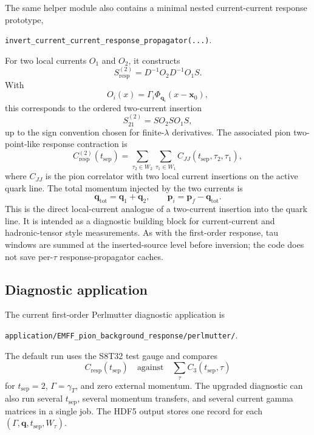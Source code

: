 \documentclass[11pt,a4paper]{article}
\newcommand{\Dslash}{D}
\newcommand{\Sresp}{S_{\mathrm{resp}}}
\newcommand{\Cthree}{C_3}
\newcommand{\Cresp}{C_{\mathrm{resp}}}
\newcommand{\Cresptwo}{C_{\mathrm{resp}}^{(2)}}
\begin{document}
The same helper module also contains a minimal nested current-current response
prototype,
\begin{center}
\texttt{invert\_current\_current\_response\_propagator(...)}.
\end{center}
For two local currents \(O_1\) and \(O_2\), it constructs
\begin{equation}
  \Sresp^{(2)}
  =
  \Dslash^{-1} O_2 \Dslash^{-1} O_1 S.
\end{equation}
With
\begin{equation}
  O_i(x)
  =
  \Gamma_i \Phi_{\mathbf q_i}(x-\mathbf x_0),
\end{equation}
this corresponds to the ordered two-current insertion
\begin{equation}
  S^{(2)}_{21}
  =
  S O_2 S O_1 S,
\end{equation}
up to the sign convention chosen for finite-\(\lambda\) derivatives.  The
associated pion two-point-like response contraction is
\begin{equation}
  \Cresptwo(t_{\mathrm{sep}})
  =
  \sum_{\tau_2\in W_2}
  \sum_{\tau_1\in W_1}
  C_{JJ}(t_{\mathrm{sep}},\tau_2,\tau_1),
\end{equation}
where \(C_{JJ}\) is the pion correlator with two local current insertions on
the active quark line.  The total momentum injected by the two currents is
\begin{equation}
  \mathbf q_{\mathrm{tot}} = \mathbf q_1 + \mathbf q_2,
  \qquad
  \mathbf p_i = \mathbf p_f - \mathbf q_{\mathrm{tot}}.
\end{equation}
This is the direct local-current analogue of a two-current insertion into the
quark line.  It is intended as a diagnostic building block for current-current
and hadronic-tensor style measurements.  As with the first-order response, tau
windows are summed at the inserted-source level before inversion; the code does
not save per-\(\tau\) response-propagator caches.

\subsection{Diagnostic application}

The current first-order Perlmutter diagnostic application is
\begin{center}
\texttt{application/EMFF\_pion\_background\_response/perlmutter/}.
\end{center}
The default run uses the S8T32 test gauge and compares
\begin{equation}
  \Cresp(t_{\mathrm{sep}})
  \quad\text{against}\quad
  \sum_\tau \Cthree(t_{\mathrm{sep}},\tau)
\end{equation}
for \(t_{\mathrm{sep}}=2\), \(\Gamma=\gamma_T\), and zero external momentum.
The upgraded diagnostic can also run several \(t_{\mathrm{sep}}\), several
momentum transfers, and several current gamma matrices in a single job.  The
HDF5 output stores one record for each
\((\Gamma,\mathbf q,t_{\mathrm{sep}},W_\tau)\).
\end{document}
